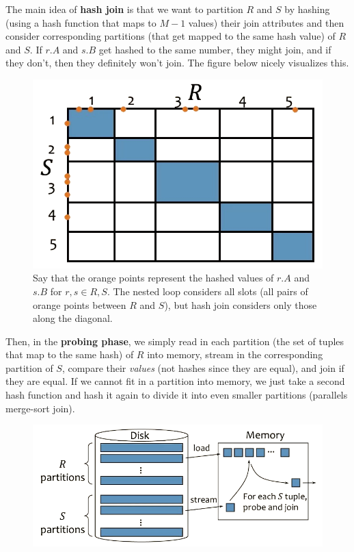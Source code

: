 \documentclass{article}
\begin{document}
      \begin{definition}
        The main idea of \textbf{hash join} is that we want to partition $R$ and $S$ by hashing (using a hash function that maps to $M-1$ values) their join attributes and then consider corresponding partitions (that get mapped to the same hash value) of $R$ and $S$. If $r.A$ and $s.B$ get hashed to the same number, they might join, and if they don't, then they definitely won't join. The figure below nicely visualizes this. 
      
        \begin{figure}[H]
          \centering 
          \includegraphics[scale=0.4]{img/hash_join.png}
          \caption{Say that the orange points represent the hashed values of $r.A$ and $s.B$ for $r, s \in R, S$. The nested loop considers all slots (all pairs of orange points between $R$ and $S$), but hash join considers only those along the diagonal. } 
          \label{fig:hash_join}
        \end{figure}

        Then, in the \textbf{probing phase}, we simply read in each partition (the set of tuples that map to the same hash) of $R$ into memory, stream in the corresponding partition of $S$, compare their \textit{values} (not hashes since they are equal), and join if they are equal. If we cannot fit in a partition into memory, we just take a second hash function and hash it again to divide it into even smaller partitions (parallels merge-sort join). 

        \begin{figure}[H]
          \centering 
          \includegraphics[scale=0.4]{img/hash_join2.png}
          \caption{} 
          \label{fig:hash_join2}
        \end{figure}


\end{definition}
\end{document}

